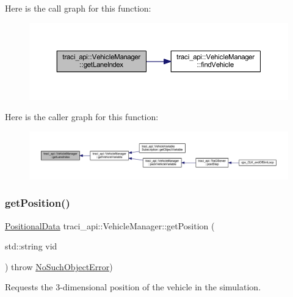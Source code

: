 Here is the call graph for this function\+:
\nopagebreak
\begin{figure}[H]
\begin{center}
\leavevmode
\includegraphics[width=350pt]{classtraci__api_1_1_vehicle_manager_a8daaf314dfb440dfb48575b072cd0d41_cgraph}
\end{center}
\end{figure}
Here is the caller graph for this function\+:
\nopagebreak
\begin{figure}[H]
\begin{center}
\leavevmode
\includegraphics[width=350pt]{classtraci__api_1_1_vehicle_manager_a8daaf314dfb440dfb48575b072cd0d41_icgraph}
\end{center}
\end{figure}
\mbox{\label{classtraci__api_1_1_vehicle_manager_ad00a8d49736c7806f0d363d641b7f467}} 
\subsubsection{\texorpdfstring{get\+Position()}{getPosition()}}
{\footnotesize\ttfamily \hyperlink{class_positional_data}{Positional\+Data} traci\+\_\+api\+::\+Vehicle\+Manager\+::get\+Position (\begin{DoxyParamCaption}\item[{std\+::string}]{vid }\end{DoxyParamCaption}) throw  \hyperlink{classtraci__api_1_1_no_such_object_error}{No\+Such\+Object\+Error}) }



Requests the 3-\/dimensional position of the vehicle in the simulation. 



